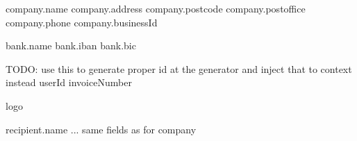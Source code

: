 {{company.name}}
{{company.address}}
{{company.postcode}}
{{company.postoffice}}
{{company.phone}}
{{company.businessId}}

{{bank.name}}
{{bank.iban}}
{{bank.bic}}

TODO: use this to generate proper id at the generator and inject that to context instead
{{userId}}
{{invoiceNumber}}

{{logo}}

{{recipient.name}}
... same fields as for company

